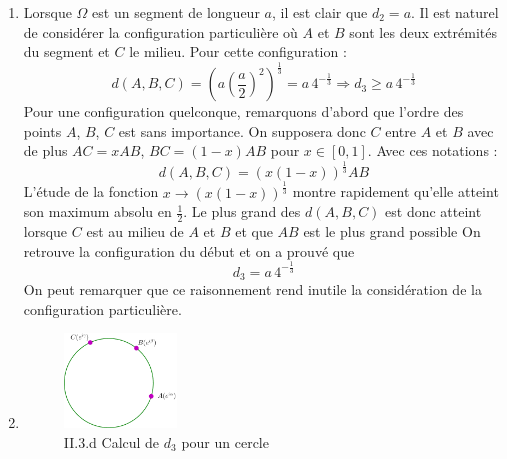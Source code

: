 \begin{enumerate}
\item Lorsque $\Omega$ est un segment de longueur $a$, il est clair que $d_2=a$.\newline
Il est naturel de considérer la configuration particulière où $A$ et $B$ sont les deux extrémités du segment et $C$ le milieu. Pour cette configuration :
\begin{displaymath}
 d(A,B,C) = \left( a(\frac{a}{2})^2\right) ^{\frac{1}{3}} = a\,4^{-\frac{1}{3}} \Rightarrow d_3 \geq a\,4^{-\frac{1}{3}}
\end{displaymath}
Pour une configuration quelconque, remarquons d'abord que l'ordre des points $A$, $B$, $C$ est sans importance. On supposera donc $C$ entre $A$ et $B$ avec de plus $AC = x AB$, $BC=(1-x)AB$ pour $x\in[0,1]$. Avec ces notations :
\begin{displaymath}
 d(A,B,C)=(x(1-x))^{\frac{1}{3}}AB
\end{displaymath}
L'étude de la fonction $x\rightarrow (x(1-x))^{\frac{1}{3}}$ montre rapidement qu'elle atteint son maximum absolu en $\frac{1}{2}$. Le plus grand des $d(A,B,C)$ est donc atteint lorsque $C$ est au milieu de $A$ et $B$ et que $AB$ est le plus grand possible On retrouve la configuration du début et on a prouvé que
\begin{displaymath}
 d_3 = a\,4^{-\frac{1}{3}}
\end{displaymath}
On peut remarquer que ce raisonnement rend inutile la considération de la configuration particulière.
\item 
\begin{figure}
   \centering
   \includegraphics[width=3cm]{Cchebydiam_6.pdf}
   \caption{II.3.d Calcul de $d_3$ pour un cercle}
   \label{fig:Cchebydiam_6}
\end{figure}


\end{enumerate}
